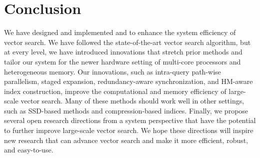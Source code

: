 \vspace{-1em}
\section{Conclusion}\label{sec:conclusion}

We have designed and implemented \Hammer and \name to enhance the system efficiency of vector search. We have followed the state-of-the-art vector search algorithm, but at every level, we have introduced innovations that stretch prior methods and tailor our system for the newer hardware setting of multi-core processors and heterogeneous memory. 
Our innovations, such as intra-query path-wise parallelism, staged expansion, redundancy-aware synchronization, and HM-aware index construction, improve the computational and memory efficiency of large-scale vector search. Many of these methods should work well in other settings, such as SSD-based methods and compression-based indices. Finally, we propose several open research directions from a system perspective that have the potential to further improve large-scale vector search. We hope these directions will inspire new research that can advance vector search and make it more efficient, robust, and easy-to-use.